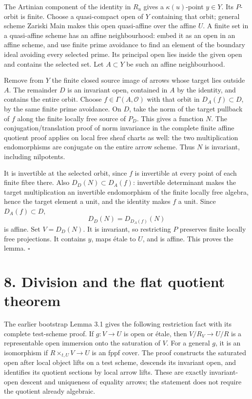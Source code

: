 \documentclass[11pt,a4paper,openany]{report}
\begin{document}
The Artinian component of the identity in \(R_u\) gives a \(\kappa(u)\)-point \(y\in Y\). Its \(P\)-orbit is finite. Choose a quasi-compact open of \(Y\) containing that orbit; general scheme Zariski Main makes this open quasi-affine over the affine \(U\). A finite set in a quasi-affine scheme has an affine neighbourhood: embed it as an open in an affine scheme, and use finite prime avoidance to find an element of the boundary ideal avoiding every selected prime. Its principal open lies inside the given open and contains the selected set. Let \(A\subset Y\) be such an affine neighbourhood.

Remove from \(Y\) the finite closed source image of arrows whose target lies outside \(A\). The remainder \(D\) is an invariant open, contained in \(A\) by the identity, and contains the entire orbit. Choose \(f\in\Gamma(A,\mathcal O)\) with that orbit in \(D_A(f)\subset D\), by the same finite prime avoidance. On \(D\), take the norm of the target pullback of \(f\) along the finite locally free source of \(P_D\). This gives a function \(N\). The conjugation/translation proof of norm invariance in the complete finite affine quotient proof applies on local free sheaf charts as well: the two multiplication endomorphisms are conjugate on the entire arrow scheme. Thus \(N\) is invariant, including nilpotents.

It is invertible at the selected orbit, since \(f\) is invertible at every point of each finite fibre there. Also \(D_D(N)\subset D_A(f)\): invertible determinant makes the target multiplication an invertible endomorphism of the finite locally free algebra, hence the target element a unit, and the identity makes \(f\) a unit. Since \(D_A(f)\subset D\), \[
  D_D(N)=D_{D_A(f)}(N)
  \] is affine. Set \(V=D_D(N)\). It is invariant, so restricting \(P\) preserves finite locally free projections. It contains \(y\), maps étale to \(U\), and is affine. This proves the lemma. \(\square\)

\section{8. Division and the flat quotient theorem}\label{AG-RG-S07-division-and-the-flat-quotient-theorem}

The earlier bootstrap Lemma 3.1 gives the following restriction fact with its complete test-scheme proof. If \(g:V\to U\) is open or étale, then \(V/R_V\to U/R\) is a representable open immersion onto the saturation of \(V\). For a general \(g\), it is an isomorphism if \(R\times_{t,U}V\to U\) is an fppf cover. The proof constructs the saturated open after local object lifts on a test scheme, descends its invariant open, and identifies its quotient sections by local arrow lifts. These are exactly invariant-open descent and uniqueness of equality arrows; the statement does not require the quotient already algebraic.
\end{document}
